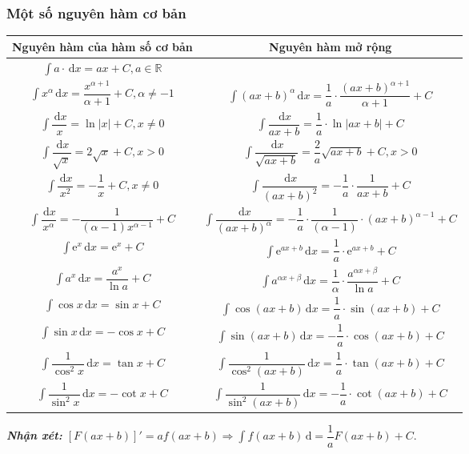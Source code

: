 \subsubsection{Một số nguyên hàm cơ bản}
\begin{longtable}{|c|c|}
	\hline
	 Nguyên hàm của hàm số cơ bản & Nguyên hàm mở rộng \\
	\hline
	$\displaystyle\int a\cdot\mathrm{\,d}x=ax+C, a\in\mathbb{R}$ & \\
	\hline
	$\displaystyle\int x^{\alpha}\mathrm{\,d}x=\dfrac{x^{\alpha+1}}{\alpha+1}+C,\alpha\neq-1$ & $\displaystyle\int(ax+b)^{\alpha}\mathrm{\,d}x=\dfrac{1}{a}\cdot\dfrac{(ax+b)^{\alpha+1}}{\alpha+1}+C$ \\
	\hline
	$\displaystyle\int\dfrac{\mathrm{\,d}x}{x}=\ln |x|+C, x\neq 0$ & $\displaystyle\int\dfrac{\mathrm{\,d}x}{ax+b}=\dfrac{1}{a}\cdot\ln |ax+b|+C$ \\
	\hline
	$\displaystyle\int\dfrac{\mathrm{\,d}x}{\sqrt{x}}=2\sqrt{x}+C, x>0$ & $\displaystyle\int\dfrac{\mathrm{\,d}x}{\sqrt{ax+b}}=\dfrac2a\sqrt{ax
	+b}+C, x>0$ \\
	\hline
	$\displaystyle\int\dfrac{\mathrm{\,d}x}{x^2}=-\dfrac{1}{x}+C, x\neq 0$ & $\displaystyle\int\dfrac{\mathrm{\,d}x}{(ax+b)^2}=-\dfrac{1}{a}\cdot \dfrac{1}{ax+b}+C$ \\
	\hline
	$\displaystyle\int\dfrac{\mathrm{\,d}x}{x^{\alpha}}=-\dfrac{1}{(\alpha-1)x^{\alpha-1}}+C$ & $\displaystyle\int\dfrac{\mathrm{\,d}x}{(ax+b)^{\alpha}}=-\dfrac{1}{a}\cdot \dfrac{1}{(\alpha-1)}\cdot (ax+b)^{\alpha-1}+C$ \\
	\hline
	$\displaystyle\int\mathrm{e}^x\mathrm{\,d}x=\mathrm{e}^x+C$ & $\displaystyle\int\mathrm{e}^{ax+b}\mathrm{\,d}x=\dfrac{1}{a}\cdot\mathrm{e}^{ax+b}+C$ \\
	\hline
	$\displaystyle\int a^x\mathrm{\,d}x=\dfrac{a^x}{\ln a}+C$ & $\displaystyle\int a^{\alpha x+\beta}\mathrm{\,d}x=\dfrac{1}{\alpha}\cdot\dfrac{a^{\alpha x+\beta}}{\ln a}+C$ \\
	\hline
	$\displaystyle\int\cos x\mathrm{\,d}x=\sin x+C$ & $\displaystyle\int\cos (ax+b)\mathrm{\,d}x=\dfrac{1}{a}\cdot\sin (ax+b)+C$ \\
	\hline
	$\displaystyle\int\sin x\mathrm{\,d}x=-\cos x+C$ & $\displaystyle\int\sin (ax+b)\mathrm{\,d}x=-\dfrac{1}{a}\cdot\cos (ax+b)+C$ \\
	\hline
	$\displaystyle\int\dfrac{1}{\cos^2x}\mathrm{\,d}x=\tan x+C$ & $\displaystyle\int\dfrac{1}{\cos^2(ax+b)}\mathrm{\,d}x=\dfrac{1}{a}\cdot \tan (ax+b)+C$ \\
	\hline
	$\displaystyle\int\dfrac{1}{\sin^2x}\mathrm{\,d}x=-\cot x+C$ & $\displaystyle\int\dfrac{1}{\sin^2(ax+b)}\mathrm{\,d}x=-\dfrac{1}{a}\cdot \cot(ax+b)+C$ \\
	\hline
\end{longtable}
\textit{\textbf{Nhận xét:} $[F(ax+b)]'=af(ax+b) \Rightarrow \int f(ax+b) \mathrm{\,d} = \dfrac{1}{a} F(ax+b)+C$}.
